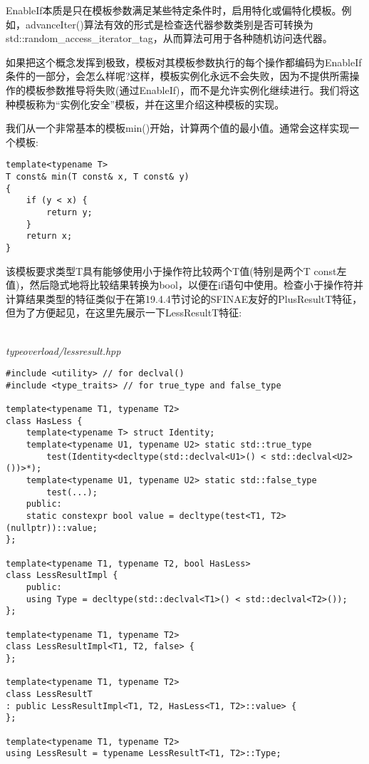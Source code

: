 EnableIf本质是只在模板参数满足某些特定条件时，启用特化或偏特化模板。例如，advanceIter()算法有效的形式是检查迭代器参数类别是否可转换为std::random\_access\_iterator\_tag，从而算法可用于各种随机访问迭代器。

如果把这个概念发挥到极致，模板对其模板参数执行的每个操作都编码为EnableIf条件的一部分，会怎么样呢?这样，模板实例化永远不会失败，因为不提供所需操作的模板参数推导将失败(通过EnableIf)，而不是允许实例化继续进行。我们将这种模板称为“实例化安全”模板，并在这里介绍这种模板的实现。

我们从一个非常基本的模板min()开始，计算两个值的最小值。通常会这样实现一个模板:

\begin{lstlisting}[style=styleCXX]
template<typename T>
T const& min(T const& x, T const& y)
{
	if (y < x) {
		return y;
	}
	return x;
}
\end{lstlisting}

该模板要求类型T具有能够使用小于操作符比较两个T值(特别是两个T const左值)，然后隐式地将比较结果转换为bool，以便在if语句中使用。检查小于操作符并计算结果类型的特征类似于在第19.4.4节讨论的SFINAE友好的PlusResultT特征，但为了方便起见，在这里先展示一下LessResultT特征:

\hspace*{\fill} \\ %
\noindent
\textit{typeoverload/lessresult.hpp}
\begin{lstlisting}[style=styleCXX]
#include <utility> // for declval()
#include <type_traits> // for true_type and false_type

template<typename T1, typename T2>
class HasLess {
	template<typename T> struct Identity;
	template<typename U1, typename U2> static std::true_type
		test(Identity<decltype(std::declval<U1>() < std::declval<U2>())>*);
	template<typename U1, typename U2> static std::false_type
		test(...);
	public:
	static constexpr bool value = decltype(test<T1, T2>(nullptr))::value;
};

template<typename T1, typename T2, bool HasLess>
class LessResultImpl {
	public:
	using Type = decltype(std::declval<T1>() < std::declval<T2>());
};

template<typename T1, typename T2>
class LessResultImpl<T1, T2, false> {
};

template<typename T1, typename T2>
class LessResultT
: public LessResultImpl<T1, T2, HasLess<T1, T2>::value> {
};

template<typename T1, typename T2>
using LessResult = typename LessResultT<T1, T2>::Type;
\end{lstlisting}

